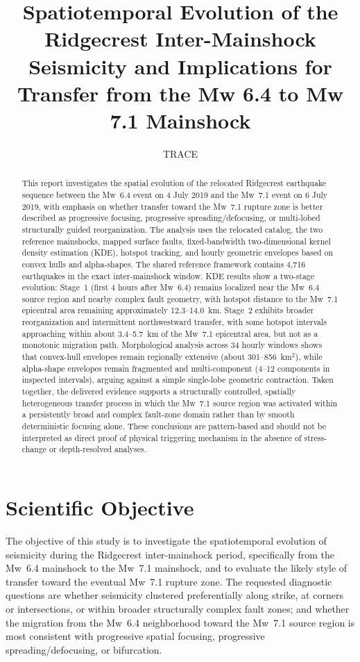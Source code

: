 \documentclass[11pt]{article}
\title{Spatiotemporal Evolution of the Ridgecrest Inter-Mainshock Seismicity and Implications for Transfer from the Mw 6.4 to Mw 7.1 Mainshock}
\author{TRACE}
\date{}
\begin{document}
\maketitle

\begin{abstract}
This report investigates the spatial evolution of the relocated Ridgecrest earthquake sequence between the Mw~6.4 event on 4 July 2019 and the Mw~7.1 event on 6 July 2019, with emphasis on whether transfer toward the Mw~7.1 rupture zone is better described as progressive focusing, progressive spreading/defocusing, or multi-lobed structurally guided reorganization. The analysis uses the relocated catalog, the two reference mainshocks, mapped surface faults, fixed-bandwidth two-dimensional kernel density estimation (KDE), hotspot tracking, and hourly geometric envelopes based on convex hulls and alpha-shapes. The shared reference framework contains 4,716 earthquakes in the exact inter-mainshock window. KDE results show a two-stage evolution: Stage~1 (first 4 hours after Mw~6.4) remains localized near the Mw~6.4 source region and nearby complex fault geometry, with hotspot distance to the Mw~7.1 epicentral area remaining approximately 12.3--14.0~km. Stage~2 exhibits broader reorganization and intermittent northwestward transfer, with some hotspot intervals approaching within about 3.4--5.7~km of the Mw~7.1 epicentral area, but not as a monotonic migration path. Morphological analysis across 34 hourly windows shows that convex-hull envelopes remain regionally extensive (about 301--856~km$^2$), while alpha-shape envelopes remain fragmented and multi-component (4--12 components in inspected intervals), arguing against a simple single-lobe geometric contraction. Taken together, the delivered evidence supports a structurally controlled, spatially heterogeneous transfer process in which the Mw~7.1 source region was activated within a persistently broad and complex fault-zone domain rather than by smooth deterministic focusing alone. These conclusions are pattern-based and should not be interpreted as direct proof of physical triggering mechanism in the absence of stress-change or depth-resolved analyses.
\end{abstract}

\section{Scientific Objective}
The objective of this study is to investigate the spatiotemporal evolution of seismicity during the Ridgecrest inter-mainshock period, specifically from the Mw~6.4 mainshock to the Mw~7.1 mainshock, and to evaluate the likely style of transfer toward the eventual Mw~7.1 rupture zone. The requested diagnostic questions are whether seismicity clustered preferentially along strike, at corners or intersections, or within broader structurally complex fault zones; and whether the migration from the Mw~6.4 neighborhood toward the Mw~7.1 source region is most consistent with progressive spatial focusing, progressive spreading/defocusing, or bifurcation.
\end{document}
